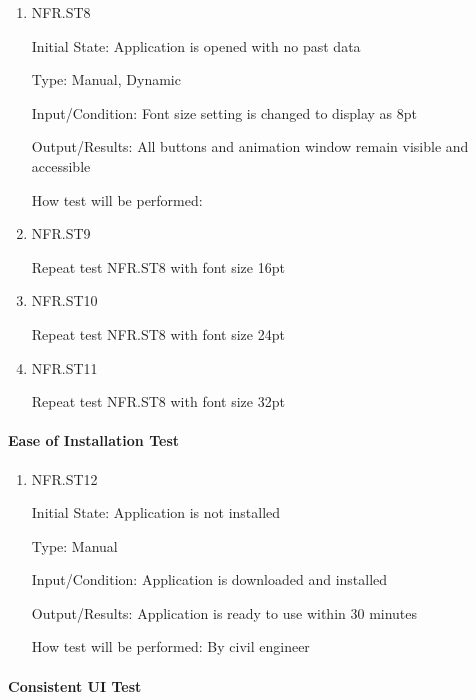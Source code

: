 \documentclass[12pt, titlepage]{article}
\begin{document}
\begin{enumerate}

\item{NFR.ST8\\}

Initial State: Application is opened with no past data

Type: Manual, Dynamic

Input/Condition: Font size setting is changed to display as 8pt

Output/Results: All buttons and animation window remain visible and accessible

How test will be performed: 

\item{NFR.ST9\\}

Repeat test NFR.ST8 with font size 16pt

\item{NFR.ST10\\}

Repeat test NFR.ST8 with font size 24pt

\item{NFR.ST11\\}

Repeat test NFR.ST8 with font size 32pt

\end{enumerate}

\paragraph{Ease of Installation Test}

\begin{enumerate}

\item{NFR.ST12\\}

Initial State: Application is not installed

Type: Manual

Input/Condition: Application is downloaded and installed

Output/Results: Application is ready to use within 30 minutes

How test will be performed: By civil engineer

\end{enumerate}

\paragraph{Consistent UI Test}
\end{document}
